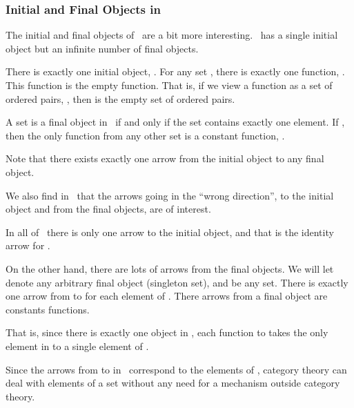 \documentclass{seminar}
\newcommand{\vs}{\vspace{0.3in}}
\begin{document}
\begin{slide}
\newslide

\subsubsection*{Initial and Final Objects in }

The initial and final objects of \, are a bit more
interesting.
\, has a single initial object but an infinite number of
final objects.

\vs

There is exactly one initial object, \tm{\emptyset}.  For any set
,
there is exactly one function, .
This
function is the empty function.  That is, if we view a function as
a set of
ordered pairs, , then 
is the
empty set of ordered pairs.

\newslide

A set  is a final object in \, if and only if the
set contains exactly
one element.  If , then the only
function from any other set is a constant function, .

\vs

Note that there exists exactly one arrow from the initial object
to any
final object.

\newslide

We also find in \, that the arrows going in the
``wrong direction'', to the initial
object and from the final objects, are of interest.

\vs

In all of \, there is only one arrow to the initial object,
and that
is the identity arrow for \tm{\emptyset}.


\vs

On the other hand, there are lots of arrows from the final objects.
We
will let  denote any arbitrary final object (singleton set),
and  be
any set.  There is exactly one arrow from  to  for
each element of
.  There arrows from a final object are constants functions.

That is, since there is exactly one object in , each function
to
 takes the only element in  to a single element of
.

\newslide

Since the arrows from  to  in \, correspond
to the
elements of , category theory can deal with elements of a set
without
any need for a mechanism outside category theory.


\end{slide}
\end{document}
